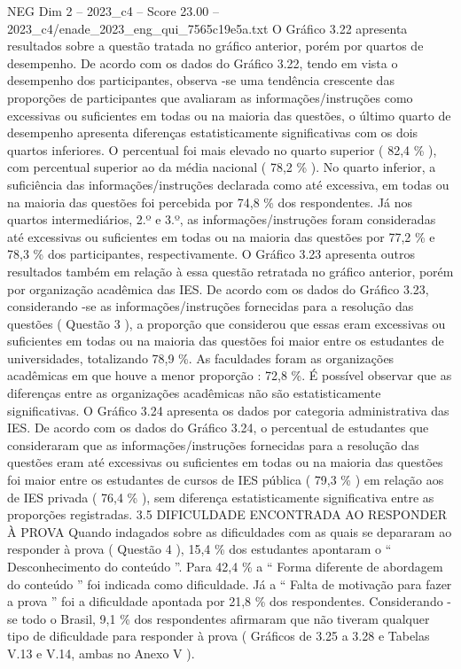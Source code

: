 \begin{textsample}{NEG Dim 2 – 2023\_c4 – Score 23.00 – 2023\_c4/enade\_2023\_eng\_qui\_7565c19e5a.txt}
O Gráfico 3.22 apresenta resultados sobre a questão tratada no gráfico anterior, porém por quartos de desempenho.
De acordo com os dados do Gráfico 3.22, tendo em vista o desempenho dos participantes, observa -se uma tendência crescente das proporções de participantes que avaliaram as informações/instruções como excessivas ou suficientes em todas ou na maioria das questões, o último quarto de desempenho apresenta diferenças estatisticamente significativas com os dois quartos inferiores.
O percentual foi mais elevado no quarto superior ( 82,4 \% ), com percentual superior ao da média nacional ( 78,2 \% ).
No quarto inferior, a suficiência das informações/instruções declarada como até excessiva, em todas ou na maioria das questões foi percebida por 74,8 \% dos respondentes.
Já nos quartos intermediários, 2.º e 3.º, as informações/instruções foram consideradas até excessivas ou suficientes em todas ou na maioria das questões por 77,2 \% e 78,3 \% dos participantes, respectivamente.
O Gráfico 3.23 apresenta outros resultados também em relação à essa questão retratada no gráfico anterior, porém por organização acadêmica das IES.
De acordo com os dados do Gráfico 3.23, considerando -se as informações/instruções fornecidas para a resolução das questões ( Questão 3 ), a proporção que considerou que essas eram excessivas ou suficientes em todas ou na maioria das questões foi maior entre os estudantes de universidades, totalizando 78,9 \%.
As faculdades foram as organizações acadêmicas em que houve a menor proporção : 72,8 \%.
É possível observar que as diferenças entre as organizações acadêmicas não são estatisticamente significativas.
O Gráfico 3.24 apresenta os dados por categoria administrativa das IES.
De acordo com os dados do Gráfico 3.24, o percentual de estudantes que consideraram que as informações/instruções fornecidas para a resolução das questões eram até excessivas ou suficientes em todas ou na maioria das questões foi maior entre os estudantes de cursos de IES pública ( 79,3 \% ) em relação aos de IES privada ( 76,4 \% ), sem diferença estatisticamente significativa entre as proporções registradas. 3.5 DIFICULDADE ENCONTRADA AO RESPONDER À PROVA Quando indagados sobre as dificuldades com as quais se depararam ao responder à prova ( Questão 4 ), 15,4 \% dos estudantes apontaram o “ Desconhecimento do conteúdo ”.
Para 42,4 \% a “ Forma diferente de abordagem do conteúdo ” foi indicada como dificuldade.
Já a “ Falta de motivação para fazer a prova ” foi a dificuldade apontada por 21,8 \% dos respondentes.
Considerando -se todo o Brasil, 9,1 \% dos respondentes afirmaram que não tiveram qualquer tipo de dificuldade para responder à prova ( Gráficos de 3.25 a 3.28 e Tabelas V.13 e V.14, ambas no Anexo V ).

\end{textsample}

